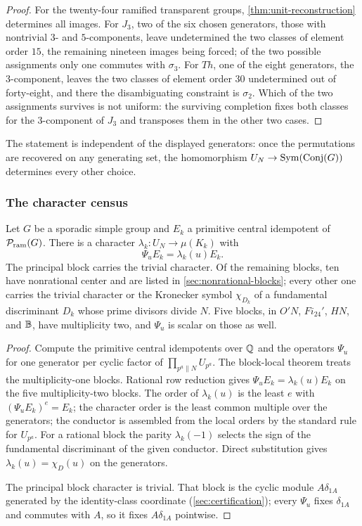 \begin{proof}
For the twenty-four ramified transparent groups,
\cref{thm:unit-reconstruction} determines all images.  For \(J_3\), two of
the six chosen generators, those with nontrivial \(3\)- and
\(5\)-components, leave undetermined the two
classes of element order \(15\), the remaining nineteen images being forced;
of the two possible assignments only one commutes with \(\sigma_3\).  For
\(Th\), one of the eight generators, the \(3\)-component, leaves the
two classes of element order \(30\) undetermined out of forty-eight, and
there the disambiguating constraint is \(\sigma_2\).  Which of the two
assignments survives is not uniform: the surviving completion fixes both
classes for the \(3\)-component of \(J_3\) and transposes them in the other
two cases.
\end{proof}

The statement is independent of the displayed generators: once the
permutations are recovered on any generating set, the homomorphism
\(U_N\to\operatorname{Sym}(\operatorname{Conj}(G))\) determines every other choice.

\subsubsection{The character census}

\begin{theorem}
\label{thm:good-label-census}
Let \(G\) be a sporadic simple group and \(E_k\) a primitive central
idempotent of \(\mathcal P_{\mathrm{ram}}(G)\).  There is a character
\(\lambda_k:U_N\to\mu(K_k)\) with
\[
 \Psi_uE_k=\lambda_k(u)E_k .
\]
The principal block carries the trivial character.  Of the remaining blocks,
ten have nonrational center and are listed in
\cref{sec:nonrational-blocks}; every other one carries the trivial character
or the Kronecker symbol \(\chi_{D_k}\) of a fundamental discriminant \(D_k\)
whose prime divisors divide \(N\).  Five blocks, in \(O'N\), \(Fi_{24}'\),
\(HN\), and \(\mathbb B\), have multiplicity two, and \(\Psi_u\) is scalar on those
as well.
\end{theorem}

\begin{proof}
Compute the primitive central idempotents over \(\mathbb Q\) and the operators
\(\Psi_u\) for one generator per cyclic factor of
\(\prod_{p^a\|N}U_{p^a}\).  The block-local theorem treats the
multiplicity-one blocks.  Rational row reduction gives
\(\Psi_uE_k=\lambda_k(u)E_k\) on the five multiplicity-two blocks.  The
order of \(\lambda_k(u)\) is the least \(e\) with
\((\Psi_uE_k)^e=E_k\); the character
order is the least common multiple over the generators; the conductor is
assembled from the local orders by the standard rule for
\(U_{p^a}\).  For a rational block the parity \(\lambda_k(-1)\) selects the
sign of the fundamental discriminant of the given conductor.  Direct
substitution gives \(\lambda_k(u)=\chi_D(u)\) on the generators.

The principal block character is trivial.  That block is the cyclic
module \(A\delta_{1A}\) generated by the identity-class coordinate
(\cref{sec:certification}); every \(\Psi_u\) fixes \(\delta_{1A}\) and
commutes with \(A\), so it fixes \(A\delta_{1A}\) pointwise.
\end{proof}

